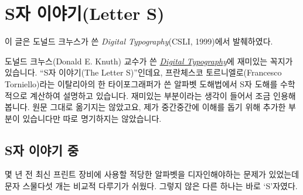 
\chapter[S자 이야기]{S자 이야기(Letter S)}


\begin{flushright}
\small\sffamily 이 글은 도널드 크누스가 쓴 \emph{Digital Typography}(CSLI, 1999)에서 발췌하였다. 
\end{flushright}


\noindent 도널드 크누스(Donald E. Knuth) 교수가 쓴
    \href{http://www-cs-faculty.stanford.edu/~knuth/dt.html}{\emph{Digital Typography}}에
    재미있는 꼭지가 있습니다. ``S자 이야기(The Letter S)''인데요,
    프란체스코 토르니엘로(Francesco Torniello)라는 이탈리아의 한
    타이포그래퍼가 쓴 알파벳 도해법에서 S자 도해를 수학적으로 계산하여
    설명하고 있습니다. 재미있는 부분이라는 생각이 들어서 조금
    인용해봅니다. 원문 그대로 옮기지는 않았고요, 제가 중간중간에
    이해를 돕기 위해 추가한 부분이 있습니다만 따로 명기하지는
    않았습니다. 


\section{S자 이야기 중}
 
몇 년 전 최신 프린트 장비에 사용할 적당한 알파벳을 디자인해야하는
문제가 있었는데 문자 스물다섯 개는 비교적 다루기가 쉬웠다. 그렇지 않은
다른 하나는 바로 `S'자였다.
\medskip

